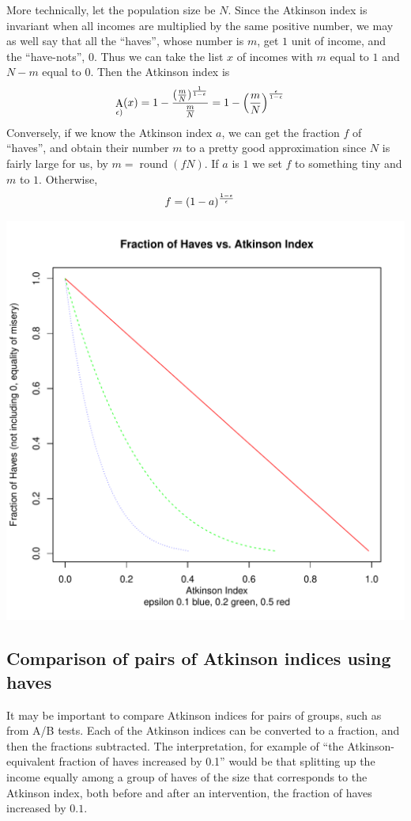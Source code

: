 \documentclass[11pt, oneside]{article}  %
\DeclareMathOperator{\Atkinson}{A}
\DeclareMathOperator{\round}{round}
\begin{document}
More technically, let the population size be $N$.  Since the Atkinson index is invariant when all incomes are multiplied by the same positive number, we may as well say that all the ``haves'', whose number is $m$, get $1$ unit of income, and the ``have-nots'', $0$.  Thus we can take the list $x$ of incomes with $m$ equal to $1$ and $N - m$ equal to $0$.  Then the Atkinson index is
\begin{align}
  \Atkinson_{\epsilon)}(x) &= 1 - \frac{(\frac{m}{N})^{\frac{1}{1 - \epsilon}}}{\frac{m}{N}} = 1 - \left(\frac{m}{N}\right)^{\frac{\epsilon}{1 - \epsilon}} \notag
\end{align}
Conversely, if we know the Atkinson index $a$, we can get the fraction $f$ of ``haves'', and obtain their number $m$ to a pretty good approximation since $N$ is fairly large for us, by $m = \round(f N)$.  If $a$ is $1$ we set $f$ to something tiny and $m$ to $1$.  Otherwise,
\begin{align}
  f &= (1 - a) ^ \frac{1 - \epsilon}{\epsilon} \notag
\end{align}

\includegraphics[scale=0.5]{../R/atkinson-to-haves.pdf}

\subsection{Comparison of pairs of Atkinson indices using haves}
It may be important to compare Atkinson indices for pairs of groups, such as from A/B tests.  Each of the Atkinson indices can be converted to a fraction, and then the fractions subtracted.  The interpretation, for example of ``the Atkinson-equivalent fraction of haves increased by 0.1'' would be that splitting up the income equally among a group of haves of the size that corresponds to the Atkinson index, both before and after an intervention, the fraction of haves increased by $0.1$.
\end{document}
